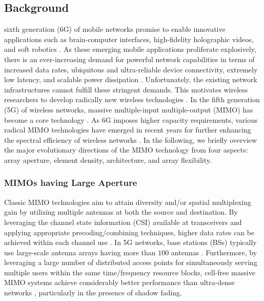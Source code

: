 \documentclass[lettersize,journal]{IEEEtran}
\begin{document}
\subsection{Background}
 sixth generation (6G) of mobile networks promise to enable innovative applications such as brain-computer interfaces, high-fidelity holographic videos, and soft robotics \cite{SCIS_2021_You_Towards}. As these emerging mobile applications proliferate explosively, there is an ever-increasing demand for powerful network capabilities in terms of increased data rates, ubiquitous and ultra-reliable device connectivity, extremely low latency, and scalable power dissipation \cite{Proc_2021_Tataria_6G}. Unfortunately, the existing network infrastructures cannot fulfill these stringent demands. This motivates wireless researchers to develop radically new wireless technologies \cite{JSAC_2020_Zhang_Prospective}. In the fifth generation (5G) of wireless networks, massive multiple-input multiple-output (MIMO) has become a core technology \cite{CM_2016_Bjornson_Massive}. As 6G imposes higher capacity requirements, various radical MIMO technologies have emerged in recent years for further enhancing the spectral efficiency of wireless networks \cite{arXiv_2023_An_Stacked_mag, arXiv_2025_An_Emerging}. In the following, we briefly overview the major evolutionary directions of the MIMO technology from four aspects: array aperture, element density, architecture, and array flexibility.
\subsubsection{MIMOs having Large Aperture}
Classic MIMO technologies aim to attain diversity and/or spatial multiplexing gain by utilizing multiple antennas at both the source and destination. By leveraging the channel state information (CSI) available at transceivers and applying appropriate precoding/combining techniques, higher data rates can be achieved within each channel use \cite{JSAC_2003_Goldsmith_Capacity, TIT_2003_Zheng_Diversity}. In 5G networks, base stations (BSs) typically use large-scale antenna arrays having more than $100$ antennas \cite{TWC_2010_Marzetta_Noncooperative}. Furthermore, by leveraging a large number of distributed access points for simultaneously serving multiple users within the same time/frequency resource blocks, cell-free massive MIMO systems achieve considerably better performance than ultra-dense networks \cite{TWC_2017_Ngo_Cell}, particularly in the presence of shadow fading.
\end{document}
